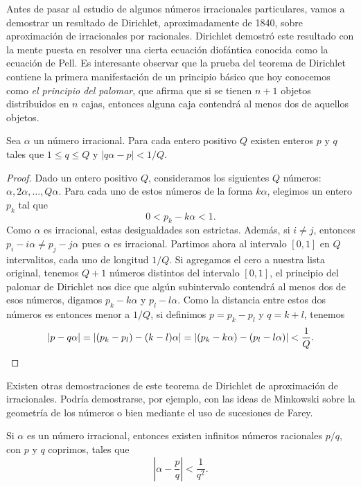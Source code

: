 Antes de pasar al estudio de algunos números irracionales particulares, vamos a
demostrar un resultado de Dirichlet, aproximadamente de 1840, sobre
aproximación de irracionales por racionales.  Dirichlet demostró este resultado
con la mente puesta en resolver una cierta ecuación diofántica conocida como la
ecuación de Pell. Es interesante observar que la prueba del teorema de
Dirichlet contiene la primera manifestación de un principio básico que hoy
conocemos como \emph{el principio del palomar}, que afirma que si se tienen 
$n+1$ objetos distribuidos en $n$ cajas, entonces alguna caja contendrá al
menos dos de aquellos objetos.

\begin{theorem}[Dirichlet]
	Sea $\alpha$ un número irracional. Para cada entero positivo $Q$ existen
	enteros $p$ y $q$ tales que $1\leq q\leq Q$ y $|q\alpha-p|<1/Q$. 
\end{theorem}

\begin{proof}
	Dado un entero positivo $Q$, consideramos los siguientes $Q$ números:
	$\alpha,2\alpha,\dots,Q\alpha$. Para cada uno de estos números de la
	forma $k\alpha$, elegimos un entero $p_k$ tal que 
	\[
		0<p_k-k\alpha<1.
	\]
	Como $\alpha$ es irracional, estas desigualdades son estrictas. Además, si
	$i\ne j$, entonces $p_i-i\alpha\ne p_j-j\alpha$ pues $\alpha$ es
	irracional. Partimos ahora al intervalo $[0,1]$ en $Q$ intervalitos, cada
	uno de longitud $1/Q$. Si agregamos el cero a nuestra lista original,
	tenemos $Q+1$ números distintos del intervalo $[0,1]$, el principio del
	palomar de Dirichlet nos dice que algún subintervalo contendrá al menos dos
	de esos números, digamos $p_k-k\alpha$ y $p_l-l\alpha$. Como la distancia
	entre estos dos números es entonces menor a $1/Q$, si definimos $p=p_k-p_l$
	y $q=k+l$, tenemos 
	\[
		|p-q\alpha|=|(p_k-p_l)-(k-l)\alpha|=|(p_k-k\alpha)-(p_l-l\alpha)|<\frac1{Q}.\qedhere
	\]
\end{proof}

Existen otras demostraciones de este teorema de Dirichlet de aproximación de
irracionales. Podría demostrarse, por ejemplo, con las ideas de Minkowski sobre
la geometría de los números o bien mediante el uso de sucesiones de Farey.

\begin{corollary}
	Si $\alpha$ es un número irracional, entonces existen infinitos números
	racionales $p/q$, con $p$ y $q$ coprimos, tales que 
	\[
		\left|\alpha-\frac{p}{q}\right|<\frac{1}{q^2}.
	\]
\end{corollary}

